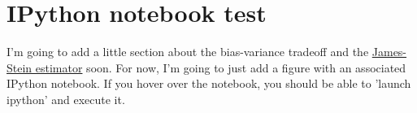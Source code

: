 \section{IPython notebook test}
  
 I'm going to add a little section about the bias-variance tradeoff and the \href{https://en.wikipedia.org/wiki/James–Stein_estimator}{James-Stein estimator} soon. For now, I'm going to just add a figure with an associated IPython notebook. If you hover over the notebook, you should be able to 'launch ipython' and execute it.